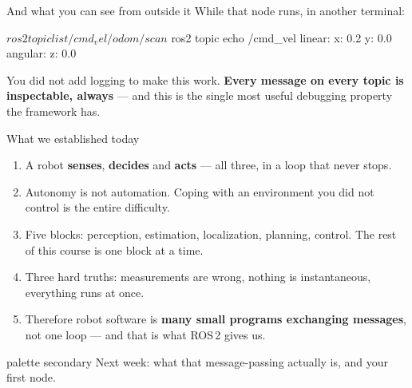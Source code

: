 \documentclass[aspectratio=169]{beamer}
\begin{document}
\begin{frame}[fragile]{And what you can see from outside it}
  \small While that node runs, in another terminal:

  \begin{shells}
$ ros2 topic list
/cmd_vel
/odom
/scan

$ ros2 topic echo /cmd_vel
linear:
  x: 0.2
  y: 0.0
angular:
  z: 0.0
  \end{shells}

  \vspace{0.3em}
  \footnotesize
  You did not add logging to make this work. \textbf{Every message on every topic is
  inspectable, always} --- and this is the single most useful debugging property the
  framework has.
\end{frame}

\begin{frame}{What we established today}
  \begin{enumerate}\small
    \item A robot \textbf{senses}, \textbf{decides} and \textbf{acts} --- all three, in a
          loop that never stops.
    \item Autonomy is not automation. Coping with an environment you did not control is the
          entire difficulty.
    \item Five blocks: perception, estimation, localization, planning, control. The rest of
          this course is one block at a time.
    \item Three hard truths: measurements are wrong, nothing is instantaneous, everything
          runs at once.
    \item Therefore robot software is \textbf{many small programs exchanging messages}, not
          one loop --- and that is what ROS\,2 gives us.
  \end{enumerate}

  \vspace{0.8em}
  \centering
  \begin{beamercolorbox}[sep=6pt,center,rounded=true]{palette secondary}
    \small Next week: what that message-passing actually is, and your first node.
  \end{beamercolorbox}
\end{frame}
\end{document}
